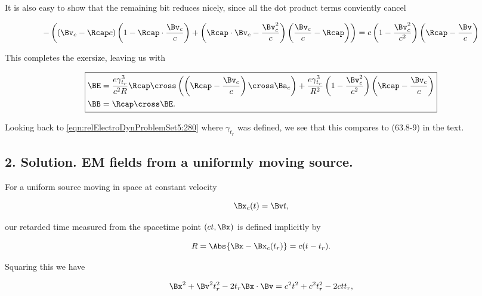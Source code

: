 It is also easy to show that the remaining bit reduces nicely, since all the dot product terms conviently cancel

\begin{equation}\label{eqn:relElectroDynProblemSet5:550}
- \left( 
\left(
\Bv_c
- \Rcap c
\right) 
\left(
1 -\Rcap \cdot \frac{\Bv_c}{c} 
\right)
+ \left( \Rcap \cdot \Bv_c - \frac{\Bv_c^2}{c} \right)
\left( \frac{\Bv_c}{c} - \Rcap \right)
\right) 
= 
c 
\left( 1 - \frac{\Bv_c^2}{c^2} \right) 
\left( \Rcap - \frac{\Bv}{c} \right)
\end{equation}

This completes the exersize, leaving us with

\begin{equation}\label{eqn:relElectroDynProblemSet5:570}
\boxed{
\begin{aligned}
\BE
&= 
\frac{e \gamma_{t_r}^3}{c^2 R} \Rcap \cross \left( \left(\Rcap - \frac{\Bv_c}{c} \right) \cross \Ba_c \right)
+\frac{e \gamma_{t_r}^3}{R^2} 
\left( 1 - \frac{\Bv_c^2}{c^2} \right) 
\left( \Rcap - \frac{\Bv_c}{c} \right) \\
\BB &= \Rcap \cross \BE.
\end{aligned}
}
\end{equation}

Looking back to \ref{eqn:relElectroDynProblemSet5:280} where $\gamma_{t_r}$ was defined, we see that this compares to (63.8-9) in the text.

\subsection{2. Solution.  EM fields from a uniformly moving source.}

For a uniform source moving in space at constant velocity

\begin{equation}\label{eqn:relElectroDynProblemSet5:590}
\Bx_c(t) = \Bv t,
\end{equation}

our retarded time measured from the spacetime point $(ct, \Bx)$ is defined implicitly by

\begin{equation}\label{eqn:relElectroDynProblemSet5:610}
R = \Abs{\Bx - \Bx_c(t_r) } = c (t - t_r).
\end{equation}

Squaring this we have

\begin{equation}\label{eqn:relElectroDynProblemSet5:630}
\Bx^2 + \Bv^2 t_r^2 - 2 t_r \Bx \cdot \Bv = c^2 t^2 + c^2 t_r^2 - 2 c t t_r,
\end{equation}

